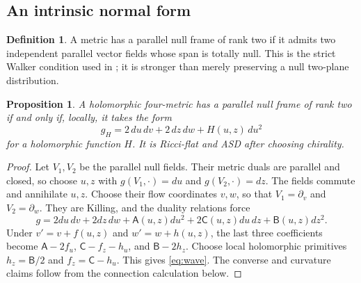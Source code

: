 \documentclass[11pt]{article}
\numberwithin{equation}{section}
\newtheorem{proposition}[theorem]{Proposition}
\theoremstyle{definition}
\newtheorem{definition}[theorem]{Definition}
\theoremstyle{remark}
\begin{document}
\subsection{An intrinsic normal form}

\begin{definition}
A metric has a parallel null frame of rank two if it admits two independent parallel vector fields whose span is totally null. This is the strict Walker condition used in \cite{BakerWave}; it is stronger than merely preserving a null two-plane distribution.
\end{definition}

\begin{proposition}\label{prop:normal-form}
A holomorphic four-metric has a parallel null frame of rank two if and only if, locally, it takes the form
\begin{equation}\label{eq:wave}
g_H=2\,du\,dv+2\,dz\,dw+H(u,z)\,du^2
\end{equation}
for a holomorphic function $H$. It is Ricci-flat and ASD after choosing chirality.
\end{proposition}
\begin{proof}
Let $V_1,V_2$ be the parallel null fields. Their metric duals are parallel and closed, so choose $u,z$ with $g(V_1,\cdot)=du$ and $g(V_2,\cdot)=dz$. The fields commute and annihilate $u,z$. Choose their flow coordinates $v,w$, so that $V_1=\partial_v$ and $V_2=\partial_w$. They are Killing, and the duality relations force
\[
g=2du\,dv+2dz\,dw+\mathsf A(u,z)du^2
+2\mathsf C(u,z)du\,dz+\mathsf B(u,z)dz^2.
\]
Under $v'=v+f(u,z)$ and $w'=w+h(u,z)$, the last three coefficients become $\mathsf A-2f_u$, $\mathsf C-f_z-h_u$, and $\mathsf B-2h_z$. Choose local holomorphic primitives $h_z=\mathsf B/2$ and $f_z=\mathsf C-h_u$. This gives \eqref{eq:wave}. The converse and curvature claims follow from the connection calculation below.
\end{proof}
\end{document}
